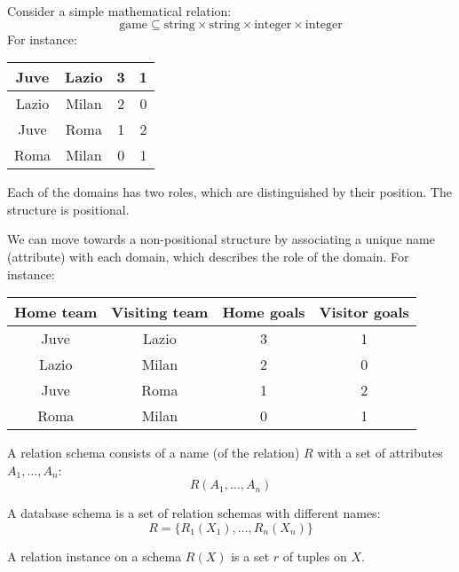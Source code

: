 \begin{example}
    Consider a simple mathematical relation:
    \[\text{game} \subseteq \text{string} \times \text{string} \times \text{integer} \times \text{integer}\]
    For instance:
    \begin{table}[H]
        \centering
        \begin{tabular}{|c|c|c|c|}
        \hline
        Juve & Lazio & 3 & 1 \\ \hline
        Lazio & Milan & 2 & 0 \\ \hline
        Juve & Roma  & 1 & 2 \\ \hline
        Roma  & Milan & 0 & 1 \\ \hline
        \end{tabular}
    \end{table}
    Each of the domains has two roles, which are distinguished by their position. 
    The structure is positional.
    
    We can move towards a non-positional structure by associating a unique name (attribute) with each domain, which describes the role of the domain. 
    For instance:
    \begin{table}[H]
        \centering
        \begin{tabular}{|c|c|c|c|}
        \hline
        \textbf{Home team} & \textbf{Visiting team} & \textbf{Home goals} & \textbf{Visitor goals} \\ \hline
        Juve & Lazio & 3 & 1 \\ \hline
        Lazio & Milan & 2 & 0 \\ \hline
        Juve & Roma  & 1 & 2 \\ \hline
        Roma  & Milan & 0 & 1 \\ \hline
        \end{tabular}
    \end{table}
\end{example}
\begin{definition}
    A relation schema consists of a name (of the relation) $R$ with a set of attributes $A_1, \dots, A_n$:
    \[R(A_1, \dots, A_n)\]
\end{definition}
\begin{definition}
    A database schema is a set of relation schemas with different names: 
    \[R = \{R_1(X_1), \dots, R_n(X_n)\}\]
\end{definition}
\begin{definition}
    A relation instance on a schema $R(X)$ is a set $r$ of tuples on $X$.
\end{definition}
